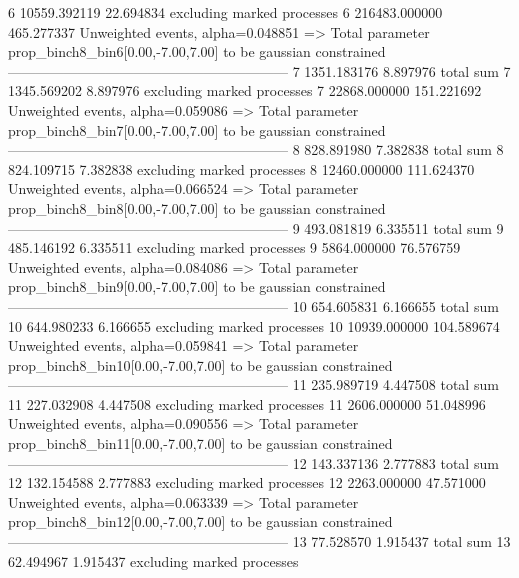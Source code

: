 6          10559.392119    22.694834       excluding marked processes    
6          216483.000000   465.277337      Unweighted events, alpha=0.048851
  => Total parameter prop_binch8_bin6[0.00,-7.00,7.00] to be gaussian constrained
------------------------------------------------------------
7          1351.183176     8.897976        total sum                     
7          1345.569202     8.897976        excluding marked processes    
7          22868.000000    151.221692      Unweighted events, alpha=0.059086
  => Total parameter prop_binch8_bin7[0.00,-7.00,7.00] to be gaussian constrained
------------------------------------------------------------
8          828.891980      7.382838        total sum                     
8          824.109715      7.382838        excluding marked processes    
8          12460.000000    111.624370      Unweighted events, alpha=0.066524
  => Total parameter prop_binch8_bin8[0.00,-7.00,7.00] to be gaussian constrained
------------------------------------------------------------
9          493.081819      6.335511        total sum                     
9          485.146192      6.335511        excluding marked processes    
9          5864.000000     76.576759       Unweighted events, alpha=0.084086
  => Total parameter prop_binch8_bin9[0.00,-7.00,7.00] to be gaussian constrained
------------------------------------------------------------
10         654.605831      6.166655        total sum                     
10         644.980233      6.166655        excluding marked processes    
10         10939.000000    104.589674      Unweighted events, alpha=0.059841
  => Total parameter prop_binch8_bin10[0.00,-7.00,7.00] to be gaussian constrained
------------------------------------------------------------
11         235.989719      4.447508        total sum                     
11         227.032908      4.447508        excluding marked processes    
11         2606.000000     51.048996       Unweighted events, alpha=0.090556
  => Total parameter prop_binch8_bin11[0.00,-7.00,7.00] to be gaussian constrained
------------------------------------------------------------
12         143.337136      2.777883        total sum                     
12         132.154588      2.777883        excluding marked processes    
12         2263.000000     47.571000       Unweighted events, alpha=0.063339
  => Total parameter prop_binch8_bin12[0.00,-7.00,7.00] to be gaussian constrained
------------------------------------------------------------
13         77.528570       1.915437        total sum                     
13         62.494967       1.915437        excluding marked processes    
